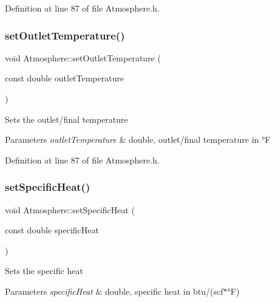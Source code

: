 Definition at line 87 of file Atmosphere.\+h.

\mbox{\label{class_atmosphere_a8f6589ab4e17d3c531bb7e0e771f4f80}} 
\subsubsection{\texorpdfstring{set\+Outlet\+Temperature()}{setOutletTemperature()}\hspace{0.1cm}{\footnotesize\ttfamily [3/3]}}
{\footnotesize\ttfamily void Atmosphere\+::set\+Outlet\+Temperature (\begin{DoxyParamCaption}\item[{const double}]{outlet\+Temperature }\end{DoxyParamCaption})\hspace{0.3cm}{\ttfamily [inline]}}

Sets the outlet/final temperature 
\begin{DoxyParams}{Parameters}
{\em outlet\+Temperature} & double, outlet/final temperature in °F \\
\hline
\end{DoxyParams}


Definition at line 87 of file Atmosphere.\+h.

\mbox{\label{class_atmosphere_a17450de3bc7a64b2736b1fe8785410cd}} 
\subsubsection{\texorpdfstring{set\+Specific\+Heat()}{setSpecificHeat()}\hspace{0.1cm}{\footnotesize\ttfamily [1/3]}}
{\footnotesize\ttfamily void Atmosphere\+::set\+Specific\+Heat (\begin{DoxyParamCaption}\item[{const double}]{specific\+Heat }\end{DoxyParamCaption})\hspace{0.3cm}{\ttfamily [inline]}}

Sets the specific heat 
\begin{DoxyParams}{Parameters}
{\em specific\+Heat} & double, specific heat in btu/(scf$\ast$°F) \\
\hline
\end{DoxyParams}


